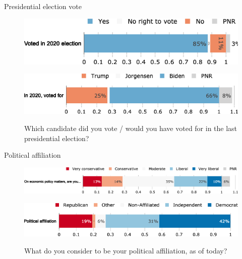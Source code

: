 \documentclass[aspectratio=169,9pt,dvipsnames]{beamer}
\begin{document}
\begin{frame}{Presidential election vote}%
\vspace{-.5cm}
\begin{figure}[h!]
\caption{Did you vote in the 2020 U.S. presidential election?}
\includegraphics[width=.6\textwidth]{../figures/US/vote_participation_US.png} \\
\vspace{.1cm}
\caption{Which candidate did you vote / would you have voted for in the last presidential election?}
\includegraphics[width=.8\textwidth]{../figures/US/vote_US.png} \\
\end{figure}
\end{frame}

\begin{frame}{Political affiliation}%
\vspace{-.5cm}
\begin{figure}[h!]
\caption{On economic policy matters, where do you see yourself on the liberal/conservative spectrum?}
\includegraphics[width=.8\textwidth]{../figures/US/liberal_conservative_US.png} \\
\vspace{.1cm}
\caption{What do you consider to be your political affiliation, as of today?}
\includegraphics[width=.8\textwidth]{../figures/US/political_affiliation_US.png}\\
\end{figure}
\end{frame}
\end{document}
